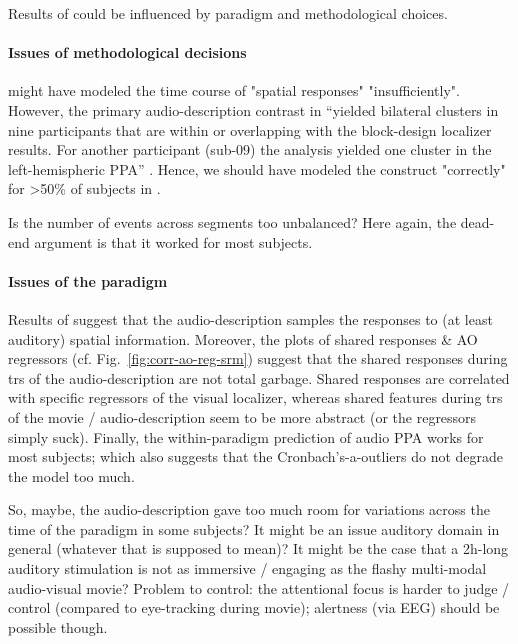 Results of \citet{haeusler2022processing} could be influenced by paradigm and
methodological choices.


\paragraph{Issues of methodological decisions}


%
\citet{haeusler2022processing} might have modeled the time course of "spatial
responses" "insufficiently".
%
However, the primary audio-description contrast in
\citet{haeusler2022processing} ``yielded bilateral clusters in nine participants
that are within or overlapping with the block-design localizer results.
%
For another participant (sub-09) the analysis yielded one cluster in the
left-hemispheric PPA'' \citep{haeusler2022processing}.
%
Hence, we should have modeled the construct "correctly" for >50\% of subjects in
\citet{haeusler2022processing}.


Is the number of events across segments too unbalanced?
%
Here again, the dead-end argument is that it worked for most subjects.


\paragraph{Issues of the paradigm}
%
Results of \citet{haeusler2022processing} suggest that the audio-description
samples the responses to (at least auditory) spatial information.
%
Moreover, the plots of shared responses \& AO regressors (cf.
Fig.~\ref{fig:corr-ao-reg-srm}) suggest that the shared responses during
\acp{tr} of the audio-description are not total garbage.
%
Shared responses are correlated with specific regressors of the visual
localizer, whereas shared features during \acp{tr} of the movie /
audio-description seem to be more abstract (or the regressors simply suck).
%
Finally, the within-paradigm prediction of audio PPA works for most subjects;
%
which also suggests that the Cronbach's-a-outliers do not degrade the model too
much.



%
So, maybe, the audio-description gave too much room for variations across the
time of the paradigm in some subjects?
%
It might be an issue auditory domain in general (whatever that is supposed to
mean)?
%
It might be the case that a 2h-long auditory stimulation is not as immersive /
engaging as the flashy multi-modal audio-visual movie?
%
Problem to control: the attentional focus is harder to judge / control (compared
to eye-tracking during movie);
%
alertness (via EEG) should be possible though.



